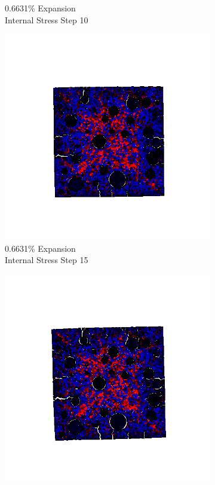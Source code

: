 \begin{figure}[ht!]
\begin{subfigure}{.25\textwidth}
      \caption{0.6631\% Expansion\\Internal Stress Step 10}
    \end{subfigure}%
    \begin{subfigure}{.25\textwidth}
      \centering
      \includegraphics[width=1.0\linewidth]{Files/exp_3D/DEF/A15X0C_3_s15.png}
      \caption{0.6631\% Expansion\\Internal Stress Step 15}
    \end{subfigure}%
    \begin{subfigure}{.25\textwidth}
      \centering
      \includegraphics[width=1.0\linewidth]{Files/exp_3D/DEF/A15X0C_3_stress.png}

\end{subfigure}
\end{figure}
